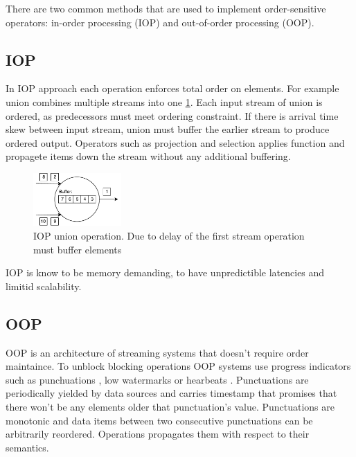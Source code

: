 
\label {fs-typical}

There are two common methods that are used to implement order-sensitive operators: in-order processing (IOP) \cite{Arasu:2006:CCQ:1146461.1146463} \cite{Cranor:2003:GSD:872757.872838} \cite{hammad2004optimizing} and out-of-order processing (OOP)\cite{Li:2008:OPN:1453856.1453890}.

\subsection{IOP}

In IOP approach each operation enforces total order on elements. For example union combines multiple streams into one \ref{iop}. Each input stream of union is ordered, as predecessors must meet ordering constraint. If there is arrival time skew between input stream, union must buffer the earlier stream to produce ordered output. Operators such as projection and selection applies function and propagete items down the stream without any additional buffering.

\begin{figure}[htbp]
  \centering
  \includegraphics[width=0.30\textwidth]{pics/iop}
  \caption{IOP union operation. Due to delay of the first stream operation must buffer elements}
  \label {iop}
\end{figure}

IOP is know to be memory demanding, to have unpredictible latencies and limitid scalability.\cite{Li:2008:OPN:1453856.1453890}

\subsection{OOP}

OOP is an architecture of streaming systems that doesn't require order maintaince. To unblock blocking operations OOP systems use progress indicators such as punchuations \cite{Tucker:2003:EPS:776752.776780}, low watermarks \cite{Akidau:2013:MFS:2536222.2536229} or hearbeats \cite{Srivastava:2004:FTM:1055558.1055596}. Punctuations are periodically yielded by data sources and carries timestamp that promises that there won't be any elements older that punctuation's value. Punctuations are monotonic and data items between two consecutive punctuations can be arbitrarily reordered. Operations propagates them with respect to their semantics.

